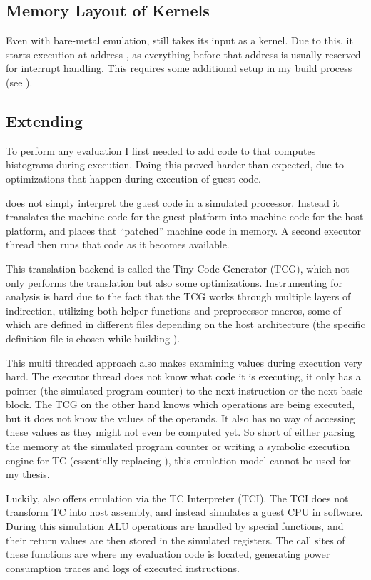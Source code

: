 \subsection{Memory Layout of \qemu{} Kernels}
\label{memory}
Even with bare-metal emulation, \qemu{} still takes its input as a kernel.
Due to this, it starts execution at address , as everything before that address is usually reserved for interrupt handling.
This requires some additional setup in my build process (see ).

\subsection{Extending \qemu{}}
To perform any evaluation I first needed to add code to \qemu{} that computes \hammingw{} histograms during execution.
Doing this proved harder than expected, due to optimizations that happen during execution of guest code.

\qemu{} does not simply interpret the guest code in a simulated processor.
Instead it translates the machine code for the guest platform into machine code for the host platform, and places that ``patched'' machine code in memory.
A second executor thread then runs that code as it becomes available.

This translation backend is called the Tiny Code Generator (TCG), which not only performs the translation but also some optimizations.
Instrumenting \qemu{} for analysis is hard due to the fact that the TCG works through multiple layers of indirection, utilizing both helper functions and preprocessor macros, some of which are defined in different files depending on the host architecture (the specific definition file is chosen while building \qemu{}).

This multi threaded approach also makes examining values during execution very hard.
The executor thread does not know what code it is executing, it only has a pointer (the simulated program counter) to the next instruction or the next basic block.
The TCG on the other hand knows which operations are being executed, but it does not know the values of the operands.
It also has no way of accessing these values as they might not even be computed yet.
So short of either parsing the memory at the simulated program counter or writing a symbolic execution engine for TC (essentially replacing \qemu{}), this emulation model cannot be used for my thesis.

Luckily, \qemu{} also offers emulation via the TC Interpreter (TCI).
The TCI does not transform TC into host assembly, and instead simulates a guest CPU in software.
During this simulation ALU operations are handled by special functions, and their return values are then stored in the simulated registers.
The call sites of these functions are where my evaluation code is located, generating power consumption traces and logs of executed instructions.

